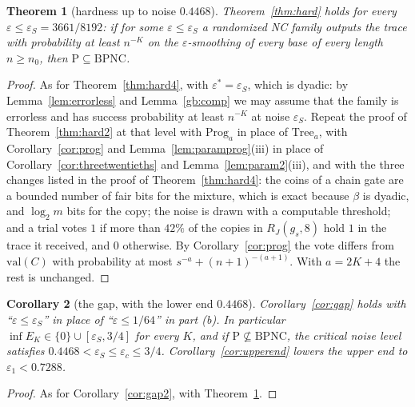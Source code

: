 \documentclass[11pt]{amsart}
\newtheorem{theorem}{Theorem}
\newtheorem{corollary}[theorem]{Corollary}
\theoremstyle{definition}
\theoremstyle{remark}
\newcommand{\eps}{\varepsilon}
\newcommand{\val}{\mathrm{val}}
\begin{document}
\begin{theorem}[hardness up to noise $0.4468$]\label{thm:hards24}
Theorem~\ref{thm:hard} holds for every $\eps\le\eps_S=3661/8192$: if for some $\eps\le\eps_S$ a
randomized NC family outputs the trace with probability at least $n^{-K}$ on the
$\eps$-smoothing of every base of every length $n\ge n_0$, then $\mathrm P\subseteq\mathrm{BPNC}$.
\end{theorem}

\begin{proof}
As for Theorem~\ref{thm:hard4}, with $\eps^*=\eps_S$, which is dyadic: by
Lemma~\ref{lem:errorless} and Lemma~\ref{gb:comp} we may assume that the family is errorless and
has success probability at least $n^{-K}$ at noise $\eps_S$. Repeat the proof of
Theorem~\ref{thm:hard2} at that level with $\mathrm{Prog}_a$ in place of $\mathrm{Tree}_a$, with
Corollary~\ref{cor:prog} and Lemma~\ref{lem:paramprog}(iii) in place of
Corollary~\ref{cor:threetwentieths} and Lemma~\ref{lem:param2}(iii), and with the three changes
listed in the proof of Theorem~\ref{thm:hard4}: the coins of a chain gate are a bounded number of
fair bits for the mixture, which is exact because $\beta$ is dyadic, and $\log_2m$ bits for the
copy; the noise is drawn with a computable threshold; and a trial votes $1$ if more than $42\%$ of
the copies in $R_J(g_s,8)$ hold $1$ in the trace it received, and $0$ otherwise. By
Corollary~\ref{cor:prog} the vote differs from $\val(C)$ with probability at most
$s^{-a}+(n+1)^{-(a+1)}$. With $a=2K+4$ the rest is unchanged.
\end{proof}

\begin{corollary}[the gap, with the lower end $0.4468$]\label{cor:gaps24}
Corollary~\ref{cor:gap} holds with ``$\eps\le\eps_S$'' in place of ``$\eps\le1/64$'' in part
(b). In particular $\inf E_K\in\{0\}\cup[\eps_S,3/4]$ for every $K$, and if
$\mathrm P\not\subseteq\mathrm{BPNC}$, the critical noise level satisfies
$0.4468<\eps_S\le\eps_c\le3/4$. Corollary~\ref{cor:upperend} lowers the upper end to $\eps_1<0.7288$.
\end{corollary}

\begin{proof}
As for Corollary~\ref{cor:gap2}, with Theorem~\ref{thm:hards24}.
\end{proof}
\end{document}
